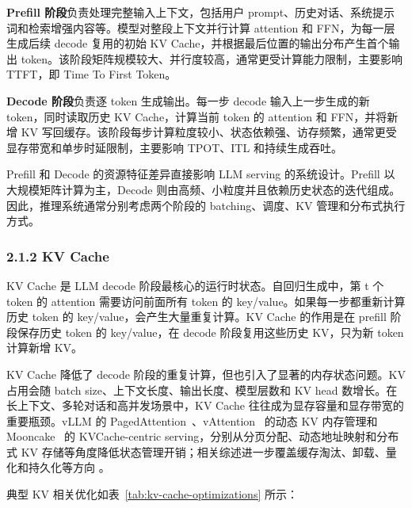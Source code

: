 \textbf{Prefill 阶段}负责处理完整输入上下文，包括用户 prompt、历史对话、系统提示词和检索增强内容等。模型对整段上下文并行计算 attention 和 FFN，为每一层生成后续 decode 复用的初始 KV Cache，并根据最后位置的输出分布产生首个输出 token。该阶段矩阵规模较大、并行度较高，通常更受计算能力限制，主要影响 TTFT，即 Time To First Token。


\textbf{Decode 阶段}负责逐 token 生成输出。每一步 decode 输入上一步生成的新 token，同时读取历史 KV Cache，计算当前 token 的 attention 和 FFN，并将新增 KV 写回缓存。该阶段每步计算粒度较小、状态依赖强、访存频繁，通常更受显存带宽和单步时延限制，主要影响 TPOT、ITL 和持续生成吞吐。


Prefill 和 Decode 的资源特征差异直接影响 LLM serving 的系统设计。Prefill 以大规模矩阵计算为主，Decode 则由高频、小粒度并且依赖历史状态的迭代组成。因此，推理系统通常分别考虑两个阶段的 batching、调度、KV 管理和分布式执行方式。




\subsubsection*{2.1.2 KV Cache}

KV Cache 是 LLM decode 阶段最核心的运行时状态。自回归生成中，第 t 个 token 的 attention 需要访问前面所有 token 的 key/value。如果每一步都重新计算历史 token 的 key/value，会产生大量重复计算。KV Cache 的作用是在 prefill 阶段保存历史 token 的 key/value，在 decode 阶段复用这些历史 KV，只为新 token 计算新增 KV。


KV Cache 降低了 decode 阶段的重复计算，但也引入了显著的内存状态问题。KV 占用会随 batch size、上下文长度、输出长度、模型层数和 KV head 数增长。在长上下文、多轮对话和高并发场景中，KV Cache 往往成为显存容量和显存带宽的重要瓶颈。vLLM 的 PagedAttention~\cite{kwon2023efficient}、vAttention~\cite{prabhu2025vattention} 的动态 KV 内存管理和 Mooncake~\cite{qin2025mooncake} 的 KVCache-centric serving，分别从分页分配、动态地址映射和分布式 KV 存储等角度降低状态管理开销；相关综述进一步覆盖缓存淘汰、卸载、量化和持久化等方向 \cite{zhou2024survey,pan2025survey}。


典型 KV 相关优化如表~\ref{tab:kv-cache-optimizations} 所示：



